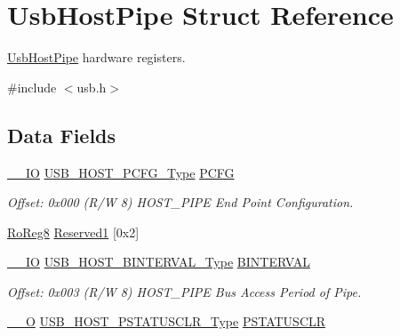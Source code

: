 \hypertarget{struct_usb_host_pipe}{}\section{Usb\+Host\+Pipe Struct Reference}
\label{struct_usb_host_pipe}


\mbox{\hyperlink{struct_usb_host_pipe}{Usb\+Host\+Pipe}} hardware registers.  




{\ttfamily \#include $<$usb.\+h$>$}

\subsection*{Data Fields}
\begin{DoxyCompactItemize}
\item 
\mbox{\hyperlink{core__cm0plus_8h_aec43007d9998a0a0e01faede4133d6be}{\+\_\+\+\_\+\+IO}} \mbox{\hyperlink{union_u_s_b___h_o_s_t___p_c_f_g___type}{U\+S\+B\+\_\+\+H\+O\+S\+T\+\_\+\+P\+C\+F\+G\+\_\+\+Type}} \mbox{\hyperlink{struct_usb_host_pipe_aaf9386b2ea951c922e1000a0534027df}{P\+C\+FG}}
\begin{DoxyCompactList}\small\item\em Offset\+: 0x000 (R/W 8) H\+O\+S\+T\+\_\+\+P\+I\+PE End Point Configuration. \end{DoxyCompactList}\item 
\mbox{\hyperlink{group___s_a_m_d21_e15_a__definitions_ga0d957f1433aaf5d70e4dc2b68288442d}{Ro\+Reg8}} \mbox{\hyperlink{struct_usb_host_pipe_a3e42d171d4eb8eda7a030a3453f2d9c0}{Reserved1}} \mbox{[}0x2\mbox{]}
\item 
\mbox{\hyperlink{core__cm0plus_8h_aec43007d9998a0a0e01faede4133d6be}{\+\_\+\+\_\+\+IO}} \mbox{\hyperlink{union_u_s_b___h_o_s_t___b_i_n_t_e_r_v_a_l___type}{U\+S\+B\+\_\+\+H\+O\+S\+T\+\_\+\+B\+I\+N\+T\+E\+R\+V\+A\+L\+\_\+\+Type}} \mbox{\hyperlink{struct_usb_host_pipe_a921cde8e177ca6129f638373f8e8e8b5}{B\+I\+N\+T\+E\+R\+V\+AL}}
\begin{DoxyCompactList}\small\item\em Offset\+: 0x003 (R/W 8) H\+O\+S\+T\+\_\+\+P\+I\+PE Bus Access Period of Pipe. \end{DoxyCompactList}\item 
\mbox{\hyperlink{core__cm0plus_8h_a7e25d9380f9ef903923964322e71f2f6}{\+\_\+\+\_\+O}} \mbox{\hyperlink{union_u_s_b___h_o_s_t___p_s_t_a_t_u_s_c_l_r___type}{U\+S\+B\+\_\+\+H\+O\+S\+T\+\_\+\+P\+S\+T\+A\+T\+U\+S\+C\+L\+R\+\_\+\+Type}} \mbox{\hyperlink{struct_usb_host_pipe_a39bc5cb8cb76ecb010c9608521f9eb65}{P\+S\+T\+A\+T\+U\+S\+C\+LR}}

\end{DoxyCompactItemize}
